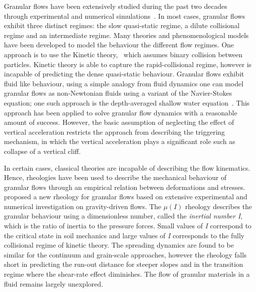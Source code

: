 Granular flows have been extensively studied during the past two decades 
through experimental and numerical 
simulations~\citep{Jaeger1996,Iverson1997a,Denlinger2001,Tang2013,Andersen2010}.
In most cases, granular flows exhibit three distinct regimes: the slow 
quasi-static regime, a dilute collisional regime and an intermediate regime. 
Many theories and phenomenological models have been developed to model the 
behaviour the different flow regimes. One approach is to use the Kinetic 
theory,~\citep{Jenkins1983, Savage1981} which assumes binary collision between 
particles. Kinetic theory is able to capture the rapid-collisional regime, 
however is incapable of predicting the dense quasi-static behaviour. Granular 
flows exhibit fluid like behaviour, using a simple analogy from fluid 
dynamics one can model granular flows as non-Newtonian fluids using a variant 
of the Navier-Stokes equation; one such approach is the depth-averaged shallow 
water equation~\citep{Savage1991}. This approach has been applied to solve 
granular flow dynamics with a reasonable amount of success. However, the basic 
assumption of neglecting the effect of vertical acceleration restricts the 
approach from describing the triggering mechanism, in which the vertical 
acceleration plays a significant role such as collapse of a vertical cliff.

In certain cases, classical theories are incapable of describing the flow 
kinematics. Hence, rheologies have been used to describe the mechanical 
behaviour of granular flows through an empirical relation between deformations 
and stresses.~\citet{Midi2004} proposed a new rheology for granular flows based 
on extensive experimental and numerical investigation on gravity-driven flows. 
The $\mu(I)$ rheology describes the granular behaviour using a dimensionless 
number, called the \textit{inertial number I}, which is the ratio of inertia to 
the pressure forces. Small values of \textit{I} correspond to the critical 
state in soil mechanics and large values of \textit{I} corresponds to the fully 
collisional regime of kinetic theory. The spreading dynamics are found to be 
similar for the continuum and grain-scale approaches, however the rheology 
falls short in predicting the run-out distance for steeper slopes and in the 
transition regime where the shear-rate effect diminishes. The flow of granular 
materials in a fluid remains largely unexplored. 


